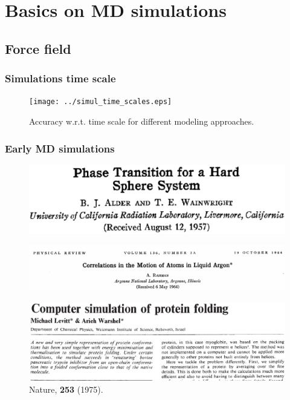 \documentclass{beamer}
\begin{document}
\section{Basics on MD simulations }
\subsection{Force field} 


\begin{frame}\frametitle{Simulations time scale}

\begin{figure}
\texttt{[image: ../simul\_time\_scales.eps]}
\caption{{\scriptsize Accuracy w.r.t. time scale for different modeling approaches.}}
\end{figure}

\end{frame}

\begin{frame}\frametitle{Early MD simulations}

\begin{minipage}[t]{0.4\linewidth}

\begin{figure}
\includegraphics[scale=0.16]{hard_spheres.eps}
\end{figure}

\end{minipage}
\hfill%
\begin{minipage}[t]{0.58\linewidth}
\begin{figure}
\includegraphics[scale=0.21]{rahman_1964.eps}
\end{figure}
\end{minipage}

\begin{figure}
\includegraphics[scale=0.19]{levitt_1975.eps}
\caption{{\scriptsize Nature, {\bf 253} (1975).}}
\end{figure}

\end{frame}
\end{document}
